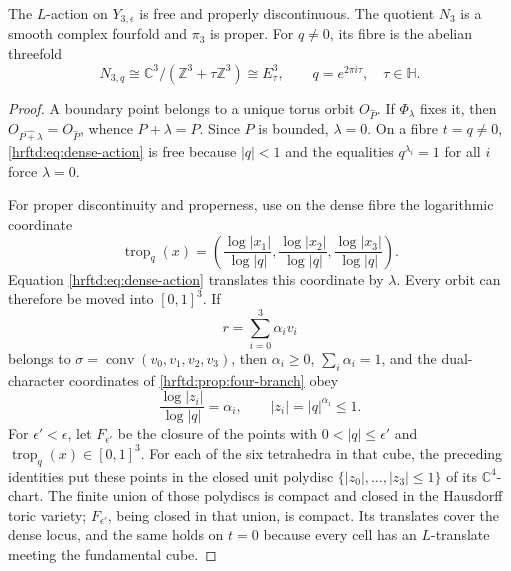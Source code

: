 \begin{theorem}
\label{hrftd:thm:toroidal-cusp}
The \(L\)-action on \(Y_{3,\epsilon}\) is free and properly discontinuous.
The quotient \(N_3\) is a smooth complex fourfold and \(\pi_3\) is proper.
For \(q\ne0\), its fibre is the abelian threefold
\[
 N_{3,q}\cong
 \mathbb C^3/(\mathbb Z^3+\tau\mathbb Z^3)
 \cong E_\tau^3,
 \qquad q=e^{2\pi i\tau},\quad \tau\in\mathbb H.
\]
\end{theorem}

\begin{proof}
A boundary point belongs to a unique torus orbit
\(O_{\widehat P}\).  If \(\Phi_\lambda\) fixes it, then
\(O_{\widehat{P+\lambda}}=O_{\widehat P}\), whence
\(P+\lambda=P\).  Since \(P\) is bounded, \(\lambda=0\).
On a fibre \(t=q\ne0\), \eqref{hrftd:eq:dense-action} is free because
\(|q|<1\) and the equalities \(q^{\lambda_i}=1\) for all \(i\) force
\(\lambda=0\).

For proper discontinuity and properness, use on the dense fibre the
logarithmic coordinate
\begin{equation}
 \operatorname{trop}_q(x)
 =
 \left(
 \frac{\log|x_1|}{\log|q|},
 \frac{\log|x_2|}{\log|q|},
 \frac{\log|x_3|}{\log|q|}
 \right).
 \label{hrftd:eq:tropical-coordinate}
\end{equation}
Equation \eqref{hrftd:eq:dense-action} translates this coordinate by
\(\lambda\).  Every orbit can therefore be moved into
\([0,1]^3\).  If
\[
 r=\sum_{i=0}^3\alpha_i v_i
\]
belongs to
\(\sigma=\operatorname{conv}(v_0,v_1,v_2,v_3)\), then
\(\alpha_i\ge0\), \(\sum_i\alpha_i=1\), and the dual-character
coordinates of \cref{hrftd:prop:four-branch} obey
\[
 \frac{\log|z_i|}{\log|q|}=\alpha_i,
 \qquad |z_i|=|q|^{\alpha_i}\le1.
\]
For \(\epsilon'<\epsilon\), let \(F_{\epsilon'}\) be the closure of the
points with \(0<|q|\le\epsilon'\) and
\(\operatorname{trop}_q(x)\in[0,1]^3\).  For each of the six tetrahedra in
that cube, the preceding identities put these points in the closed unit
polydisc \(\{|z_0|,\ldots,|z_3|\le1\}\) of its
\(\mathbb C^4\)-chart.  The finite union of those polydiscs is compact and
closed in the Hausdorff toric variety; \(F_{\epsilon'}\), being closed in
that union, is compact.  Its translates cover the dense locus, and the same
holds on \(t=0\) because every cell has an \(L\)-translate meeting the
fundamental cube.


\end{proof}

